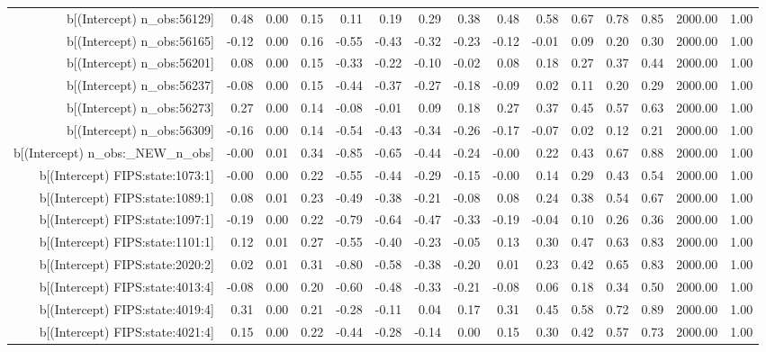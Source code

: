 \begin{table}[ht]
\begin{tabular}{rrrrrrrrrrrrrrr}
  b[(Intercept) n\_obs:56129] & 0.48 & 0.00 & 0.15 & 0.11 & 0.19 & 0.29 & 0.38 & 0.48 & 0.58 & 0.67 & 0.78 & 0.85 & 2000.00 & 1.00 \\ 
  b[(Intercept) n\_obs:56165] & -0.12 & 0.00 & 0.16 & -0.55 & -0.43 & -0.32 & -0.23 & -0.12 & -0.01 & 0.09 & 0.20 & 0.30 & 2000.00 & 1.00 \\ 
  b[(Intercept) n\_obs:56201] & 0.08 & 0.00 & 0.15 & -0.33 & -0.22 & -0.10 & -0.02 & 0.08 & 0.18 & 0.27 & 0.37 & 0.44 & 2000.00 & 1.00 \\ 
  b[(Intercept) n\_obs:56237] & -0.08 & 0.00 & 0.15 & -0.44 & -0.37 & -0.27 & -0.18 & -0.09 & 0.02 & 0.11 & 0.20 & 0.29 & 2000.00 & 1.00 \\ 
  b[(Intercept) n\_obs:56273] & 0.27 & 0.00 & 0.14 & -0.08 & -0.01 & 0.09 & 0.18 & 0.27 & 0.37 & 0.45 & 0.57 & 0.63 & 2000.00 & 1.00 \\ 
  b[(Intercept) n\_obs:56309] & -0.16 & 0.00 & 0.14 & -0.54 & -0.43 & -0.34 & -0.26 & -0.17 & -0.07 & 0.02 & 0.12 & 0.21 & 2000.00 & 1.00 \\ 
  b[(Intercept) n\_obs:\_NEW\_n\_obs] & -0.00 & 0.01 & 0.34 & -0.85 & -0.65 & -0.44 & -0.24 & -0.00 & 0.22 & 0.43 & 0.67 & 0.88 & 2000.00 & 1.00 \\ 
  b[(Intercept) FIPS:state:1073:1] & -0.00 & 0.00 & 0.22 & -0.55 & -0.44 & -0.29 & -0.15 & -0.00 & 0.14 & 0.29 & 0.43 & 0.54 & 2000.00 & 1.00 \\ 
  b[(Intercept) FIPS:state:1089:1] & 0.08 & 0.01 & 0.23 & -0.49 & -0.38 & -0.21 & -0.08 & 0.08 & 0.24 & 0.38 & 0.54 & 0.67 & 2000.00 & 1.00 \\ 
  b[(Intercept) FIPS:state:1097:1] & -0.19 & 0.00 & 0.22 & -0.79 & -0.64 & -0.47 & -0.33 & -0.19 & -0.04 & 0.10 & 0.26 & 0.36 & 2000.00 & 1.00 \\ 
  b[(Intercept) FIPS:state:1101:1] & 0.12 & 0.01 & 0.27 & -0.55 & -0.40 & -0.23 & -0.05 & 0.13 & 0.30 & 0.47 & 0.63 & 0.83 & 2000.00 & 1.00 \\ 
  b[(Intercept) FIPS:state:2020:2] & 0.02 & 0.01 & 0.31 & -0.80 & -0.58 & -0.38 & -0.20 & 0.01 & 0.23 & 0.42 & 0.65 & 0.83 & 2000.00 & 1.00 \\ 
  b[(Intercept) FIPS:state:4013:4] & -0.08 & 0.00 & 0.20 & -0.60 & -0.48 & -0.33 & -0.21 & -0.08 & 0.06 & 0.18 & 0.34 & 0.50 & 2000.00 & 1.00 \\ 
  b[(Intercept) FIPS:state:4019:4] & 0.31 & 0.00 & 0.21 & -0.28 & -0.11 & 0.04 & 0.17 & 0.31 & 0.45 & 0.58 & 0.72 & 0.89 & 2000.00 & 1.00 \\ 
  b[(Intercept) FIPS:state:4021:4] & 0.15 & 0.00 & 0.22 & -0.44 & -0.28 & -0.14 & 0.00 & 0.15 & 0.30 & 0.42 & 0.57 & 0.73 & 2000.00 & 1.00 \\ 

\end{tabular}
\end{table}
